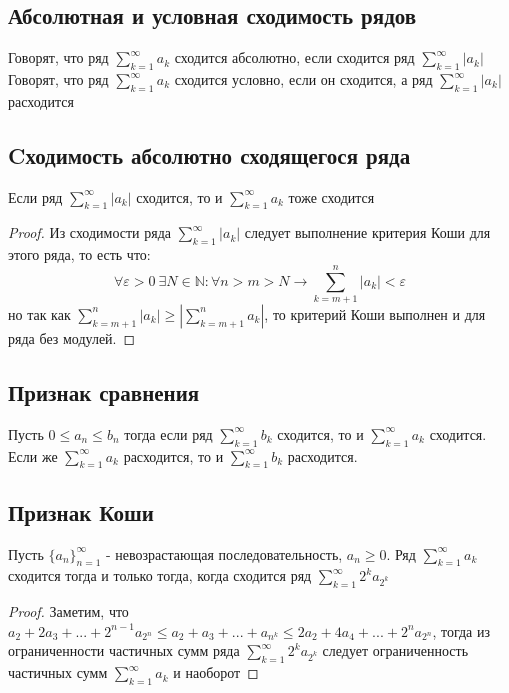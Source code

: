 \documentclass[12pt]{article}
\theoremstyle{definition}
\begin{document}
\subsection{Абсолютная и условная сходимость рядов}
Говорят, что ряд $\displaystyle\sum_{k = 1}^{\infty}a_k$ сходится абсолютно, если сходится ряд $\displaystyle\sum_{k = 1}^{\infty}|a_k|$ \\
Говорят, что ряд $\displaystyle\sum_{k = 1}^{\infty}a_k$ сходится условно, если он сходится, а ряд $\displaystyle\sum_{k = 1}^{\infty}|a_k|$ расходится 

\subsection{Cходимость абсолютно сходящегося ряда}
Если ряд $\displaystyle\sum_{k = 1}^{\infty}|a_k|$ сходится, то и $\displaystyle\sum_{k = 1}^{\infty}a_k$ тоже сходится
\begin{proof}
Из сходимости ряда $\displaystyle\sum_{k = 1}^{\infty}|a_k|$ следует выполнение критерия Коши для этого ряда, то есть что:
$$\forall \varepsilon > 0 \ \exists N \in \mathbb{N}: \forall n > m > N \to \displaystyle\sum_{k = m + 1}^{n}|a_k| < \varepsilon$$
но так как $\displaystyle\sum_{k = m + 1}^{n}|a_k| \geq \left|\displaystyle\sum_{k = m + 1}^{n}a_k\right|$, то критерий Коши выполнен и для ряда без модулей.
\end{proof}

\subsection{Признак сравнения}
Пусть $0 \leq a_n \leq b_n$ тогда если ряд $\displaystyle\sum_{k = 1}^{\infty}b_k$ сходится, то и $\displaystyle\sum_{k = 1}^{\infty}a_k$ сходится.\\
Если же $\displaystyle\sum_{k = 1}^{\infty}a_k$ расходится, то и $\displaystyle\sum_{k = 1}^{\infty}b_k$ расходится.

\subsection{Признак Коши}
Пусть $\textstyle\{a_n\}_{n=1}^{\infty}$ - невозрастающая последовательность, $ a_n \geq 0$. Ряд $\displaystyle\sum_{k = 1}^{\infty}a_k$ сходится тогда и только тогда, когда сходится ряд $\displaystyle\sum_{k = 1}^{\infty}2^k a_{2^k}$
\begin{proof}
Заметим, что $a_2 + 2a_3 + ... + 2^{n-1}a_{2^n} \leq a_2 + a_3 + ... + a_{n^k} \leq 2a_2+ 4a_4 + ... + 2^n a_{2^n}$, тогда из ограниченности частичных сумм ряда $
\displaystyle\sum_{k = 1}^{\infty}2^k a_{2^k}$ следует ограниченность частичных сумм $\displaystyle\sum_{k = 1}^{\infty}a_k$ и наоборот
\end{proof}
\end{document}
